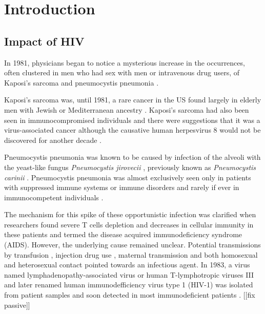 \documentclass[../sherrill-Mix_thesis.tex]{subfiles}
\begin{document}
\graphicspath{{im/}{intro/im/}}
\chapter{Introduction}
\section{Impact of HIV}
	In 1981, physicians began to notice a mysterious increase in the occurrences, often clustered in men who had sex with men or intravenous drug users, of Kaposi's sarcoma and pneumocystis pneumonia \citep{Gottlieb1981,Friedman-Kien1981,Hymes1981,Masur1981,Siegal1981,Gottlieb1981a}. 
	
	Kaposi's sarcoma was, until 1981, a rare cancer in the US found largely in elderly men with Jewish or Mediterranean ancestry \citep{Laor1979}. Kaposi's sarcoma had also been seen in immunocompromised individuals \citep{Klein1974,Myers1974,Kapadia1977} and there were suggestions that it was a virus-associated cancer \citep{Safai1981} although the causative human herpesvirus 8 would not be discovered for another decade \citep{Chang1994,Sitas1999}. 
	
	Pneumocystis pneumonia was known to be caused by infection of the alveoli with the yeast-like fungus \emph{Pneumocystis jirovecii} \citep{Burke1973,Hughes1977}, previously known as \emph{Pneumocystis carinii} \citep{Stringer2009}. Pneumocystis pneumonia was almost exclusively seen only in patients with suppressed immune systems or immune disorders and rarely if ever in immunocompetent individuals \citep{Hughes1977}.

	The mechanism for this spike of these opportunistic infection was clarified when researchers found severe T cells depletion and decreases in cellular immunity in these patients \citep{Masur1981,Siegal1981,Gottlieb1981a,Gerstoft1982,Masur1982} and termed the disease acquired immunodeficiency syndrome (AIDS). However, the underlying cause remained unclear. Potential transmissions by transfusion \citep{Ammann1982,Ehrenkranz1982,Poon1982}, injection drug use \citep{Masur1981,Masur1982,Greene1982}, maternal transmission \citep{OReilly1982} and both homosexual \citep{Fannin1982,Gerstoft1982} and heterosexual \citep{Masur1982,Harris1983} contact pointed towards an infectious agent. In 1983, a virus named lymphadenopathy-associated virus or human T-lymphotropic viruses III and later renamed human immunodefficiency virus type 1 (HIV-1) was isolated from patient samples \citep{Barre-Sinoussi1983,Gallo1983,Popovic1984,Levy1984} and soon detected in most immunodeficient patients \citep{Gallo1984,Sarngadharan1984,Safai1984,Levy1984}.  [[fix passive]]
\end{document}
